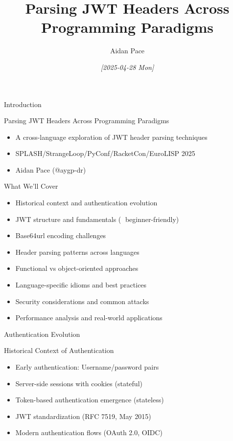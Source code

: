 \documentclass[presentation,aspectratio=169]{beamer}
\author{Aidan Pace}
\date{\textit{{[}2025-04-28 Mon]}}
\title{Parsing JWT Headers Across Programming Paradigms}
\begin{document}
\maketitle
\begin{frame}[label={sec:org098aec0}]{Introduction}
\begin{block}{Parsing JWT Headers Across Programming Paradigms}
\begin{itemize}[<+->]
\item A cross-language exploration of JWT header parsing techniques
\item SPLASH/StrangeLoop/PyConf/RacketCon/EuroLISP 2025
\item Aidan Pace (@aygp-dr)
\end{itemize}
\end{block}
\begin{block}{What We'll Cover}
\begin{itemize}[<+->]
\item Historical context and authentication evolution
\item JWT structure and fundamentals (🔰 beginner-friendly)
\item Base64url encoding challenges
\item Header parsing patterns across languages
\item Functional vs object-oriented approaches
\item Language-specific idioms and best practices
\item Security considerations and common attacks
\item Performance analysis and real-world applications
\end{itemize}
\end{block}
\end{frame}
\begin{frame}[label={sec:org1fb45f0}]{Authentication Evolution}
\begin{block}{Historical Context of Authentication}
\begin{itemize}[<+->]
\item Early authentication: Username/password pairs
\item Server-side sessions with cookies (stateful)
\item Token-based authentication emergence (stateless)
\item JWT standardization (RFC 7519, May 2015)
\item Modern authentication flows (OAuth 2.0, OIDC)
\end{itemize}
\end{block}
\end{frame}
\end{document}
